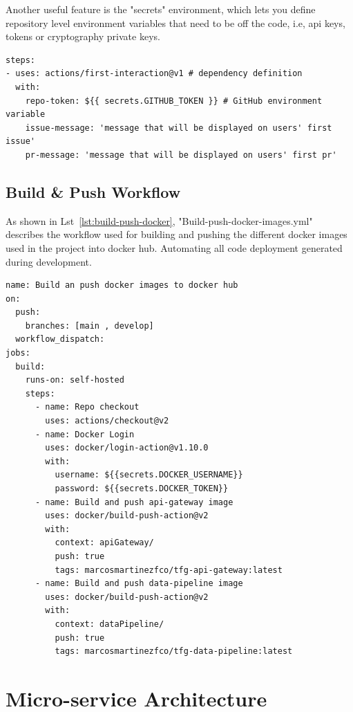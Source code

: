 Another useful feature is the "secrets" environment, which lets you define repository level environment variables that need to be off the code, i.e, api keys, tokens or cryptography private keys.

\begin{lstlisting}[caption=Steps Definition,label={lst:step-definition}]
steps:
- uses: actions/first-interaction@v1 # dependency definition
  with:
    repo-token: ${{ secrets.GITHUB_TOKEN }} # GitHub environment variable
    issue-message: 'message that will be displayed on users' first issue'
    pr-message: 'message that will be displayed on users' first pr'
\end{lstlisting}

\subsection{Build \& Push Workflow}

As shown in Lst~\ref{lst:build-push-docker}, "Build-push-docker-images.yml" describes the workflow used for building and pushing the different docker images used in the project into docker hub. Automating all code deployment generated during development.

\begin{lstlisting}[caption=build-push-docker-images.yml,label={lst:build-push-docker}]
name: Build an push docker images to docker hub
on:
  push:
    branches: [main , develop]
  workflow_dispatch:
jobs:
  build:
    runs-on: self-hosted
    steps:
      - name: Repo checkout
        uses: actions/checkout@v2
      - name: Docker Login
        uses: docker/login-action@v1.10.0
        with:
          username: ${{secrets.DOCKER_USERNAME}}
          password: ${{secrets.DOCKER_TOKEN}}
      - name: Build and push api-gateway image
        uses: docker/build-push-action@v2
        with:
          context: apiGateway/
          push: true
          tags: marcosmartinezfco/tfg-api-gateway:latest
      - name: Build and push data-pipeline image
        uses: docker/build-push-action@v2
        with:
          context: dataPipeline/
          push: true
          tags: marcosmartinezfco/tfg-data-pipeline:latest
\end{lstlisting}

\section{Micro-service Architecture}
\label{Micro-service Architecture}

